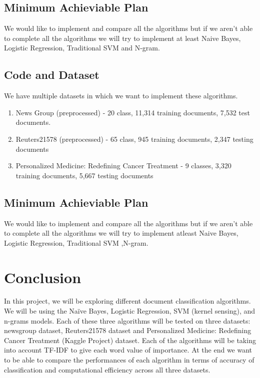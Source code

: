 \documentclass[10pt,twocolumn,letterpaper]{article}
\begin{document}
\subsection{Minimum Achieviable Plan}
We would like to implement and compare all the algorithms but if we aren't able to complete all the algorithms we will try to implement at least Naive Bayes, Logistic Regression, Traditional SVM and N-gram.

	\subsection{Code and Dataset}
We have multiple datasets in which we want to implement these algorithms. 
\begin{enumerate}
	\item News Group (preprocessed) - 20 class, 11,314 training documents,  7,532 test documents.
	\item Reuters21578 (preprocessed) - 65 class, 945 training documents,  2,347 testing documents \cite{dataset}
	\item Personalized Medicine: Redefining Cancer Treatment - 9 classes,  3,320 training documents, 5,667 testing documents  \cite{kaggledataset}
\end{enumerate}

\subsection{Minimum Achieviable Plan}
We would like to implement and compare all the algorithms but if we aren't able to complete all the algorithms we will try to implement atleast Naive Bayes, Logistic Regression, Traditional SVM ,N-gram.

\section{Conclusion}
In this project, we will be exploring different document classification algorithms. We will be using the Naïve Bayes, Logistic Regression, SVM (kernel sensing), and n-grams models. Each of these three algorithms will be tested on three datasets: newsgroup dataset, Reuters21578 dataset and Personalized Medicine: Redefining Cancer Treatment (Kaggle Project) dataset. Each of the algorithms will be taking into account TF-IDF to give each word value of importance. At the end we want to be able to compare the performances of each algorithm in terms of accuracy of classification and computational efficiency across all three datasets. 
\end{document}
